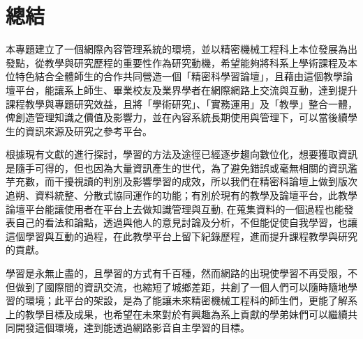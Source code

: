\chapter{總結}
\renewcommand{\baselinestretch}{10} %
\par
\renewcommand{\baselinestretch}{1} %
\twelve 本專題建立了一個網際內容管理系統的環境，並以精密機械工程科上本位發展為出發點，從教學與研究歷程的重要性作為研究動機，希望能夠將科系上學術課程及本位特色結合全體師生的合作共同營造一個「精密科學習論壇」，且藉由這個教學論壇平台，能讓系上師生、畢業校友及業界學者在網際網路上交流與互動，達到提升課程教學與專題研究效益，且將「學術研究」、「實務運用」及「教學」整合一體，俾創造管理知識之價值及影響力，並在內容系統長期使用與管理下，可以當後續學生的資訊來源及研究之參考平台。
\\
\par
\renewcommand{\baselinestretch}{1} %
\twelve 根據現有文獻的進行探討，學習的方法及途徑已經逐步趨向數位化，想要獲取資訊是隨手可得的，但也因為大量資訊產生的世代，為了避免錯誤或毫無相關的資訊濫芋充數，而干擾視讀的判別及影響學習的成效，所以我們在精密科論壇上做到版次追朔、資料統整、分散式協同運作的功能；有別於現有的教學及論壇平台，此教學論壇平台能讓使用者在平台上去做知識管理與互動, 在蒐集資料的一個過程也能發表自己的看法和論點，透過與他人的意見討論及分析，不但能促使自我學習，也讓這個學習與互動的過程，在此教學平台上留下紀錄歷程，進而提升課程教學與研究的貢獻。 
\\
\par
\renewcommand{\baselinestretch}{1} %
\twelve 學習是永無止盡的，且學習的方式有千百種，然而網路的出現使學習不再受限，不但做到了國際間的資訊交流，也縮短了城鄉差距，共創了一個人們可以隨時隨地學習的環境；此平台的架設，是為了能讓未來精密機械工程科的師生們，更能了解系上的教學目標及成果，也希望在未來對於有興趣為系上貢獻的學弟妹們可以繼續共同開發這個環境，達到能透過網路影音自主學習的目標。
\par
